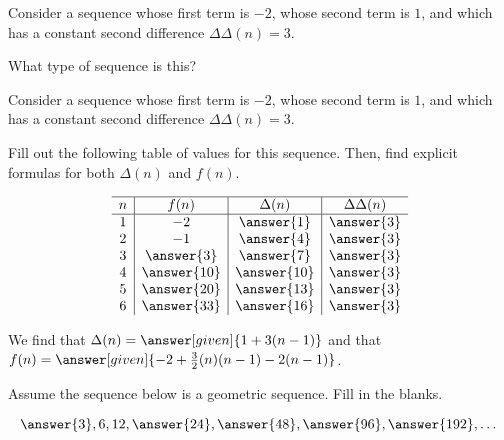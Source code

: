 \documentclass[nooutcomes]{ximera}
\begin{document}
\begin{problem}
Consider a sequence whose first term is $-2$, whose second term is $1$, and which has a constant second difference $\Delta \Delta (n) =3$.

What type of sequence is this?
\begin{multipleChoice}
\end{multipleChoice}


\end{problem}



\begin{problem}
Consider a sequence whose first term is $-2$, whose second term is $1$, and which has a constant second difference $\Delta \Delta (n) =3$.

Fill out the following table of values for this sequence.  Then, find explicit formulas for both $\Delta(n)$ and $f(n)$.

\[
\begin{array}{c|c|c|c} \hline
n & f(n) & \Delta(n) & \Delta \Delta(n) \\ \hline
1 & -2 & \answer{1} & \answer{3} \\
2 & -1 & \answer{4} & \answer{3} \\
3 & \answer{3} & \answer{7} & \answer{3} \\
4 & \answer{10} & \answer{10} & \answer{3} \\
5 & \answer{20} & \answer{13} & \answer{3} \\
6 & \answer{33} & \answer{16} & \answer{3} \\
\end{array}
\]

\begin{prompt}
We find that $\Delta(n) = \answer[given]{1+3(n-1)}$ and that $f(n) = \answer[given]{-2 + \frac{3}{2} (n)(n-1) - 2(n-1)}$.
\end{prompt}

\end{problem}




\begin{problem}
Assume the sequence below is a geometric sequence.  Fill in the blanks.

\[
\answer{3}, 6, 12, \answer{24}, \answer{48}, \answer{96}, \answer{192}, \dots
\]

\end{problem}
\end{document}
